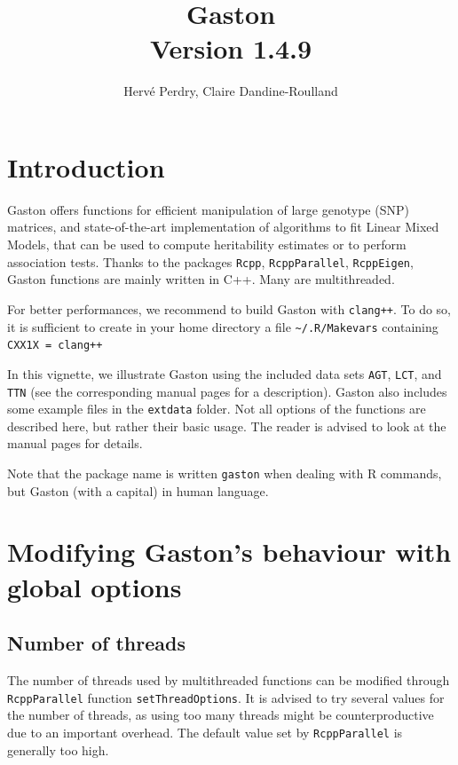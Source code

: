 \documentclass{article}
\title{{\bfseries Gaston}\\
       {\large Version 1.4.9}}
\author{Hervé Perdry, Claire Dandine-Roulland}
\begin{document}
\maketitle

\section*{Introduction}

  Gaston offers functions for efficient manipulation of 
  large genotype (SNP) matrices, and state-of-the-art implementation of algorithms
  to fit Linear Mixed Models, that can be used to compute heritability 
  estimates or to perform association tests.
  Thanks to the packages \verb!Rcpp!, \verb!RcppParallel!, \verb!RcppEigen!, Gaston
  functions are mainly written in C++. Many are multithreaded.

  For better performances, we recommend to build Gaston with \verb!clang++!.
  To do so, it is sufficient to create in your home directory
  a file \verb!~/.R/Makevars! containing \verb!CXX1X = clang++! 

  In this vignette, we illustrate Gaston using the included data sets \verb!AGT!, \verb!LCT!,
  and \verb!TTN! (see the corresponding manual pages for a description). 
  Gaston also includes some example files in the \verb!extdata! folder. 
  Not all options of the functions are described here, but rather their basic usage.
  The reader is advised to look at the manual pages for details.

  Note that the package name is written \verb!gaston! when dealing with R commands, 
  but Gaston (with a capital) in human language.

\section{Modifying Gaston's behaviour with global options}

\subsection{Number of threads}

  The number of threads used by multithreaded functions can be modified 
  through \verb!RcppParallel!  function \verb!setThreadOptions!.
  It is advised to try several values for the number of threads, as 
  using too many threads might be counterproductive due to an important
  overhead. The default value set by \verb!RcppParallel! is generally
  too high.
\end{document}
